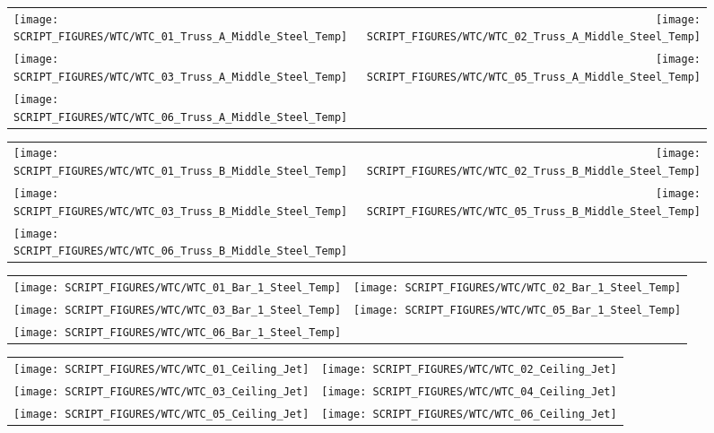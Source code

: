 \begin{figure}[!ht]
\begin{tabular*}{\textwidth}{l@{\extracolsep{\fill}}r}
\texttt{[image: SCRIPT\_FIGURES/WTC/WTC\_01\_Truss\_A\_Middle\_Steel\_Temp]} &
\texttt{[image: SCRIPT\_FIGURES/WTC/WTC\_02\_Truss\_A\_Middle\_Steel\_Temp]} \\
\texttt{[image: SCRIPT\_FIGURES/WTC/WTC\_03\_Truss\_A\_Middle\_Steel\_Temp]} &
\texttt{[image: SCRIPT\_FIGURES/WTC/WTC\_05\_Truss\_A\_Middle\_Steel\_Temp]} \\
\texttt{[image: SCRIPT\_FIGURES/WTC/WTC\_06\_Truss\_A\_Middle\_Steel\_Temp]}
\end{tabular*}
\end{figure}

\begin{figure}[!ht]
\begin{tabular*}{\textwidth}{l@{\extracolsep{\fill}}r}
\texttt{[image: SCRIPT\_FIGURES/WTC/WTC\_01\_Truss\_B\_Middle\_Steel\_Temp]} &
\texttt{[image: SCRIPT\_FIGURES/WTC/WTC\_02\_Truss\_B\_Middle\_Steel\_Temp]} \\
\texttt{[image: SCRIPT\_FIGURES/WTC/WTC\_03\_Truss\_B\_Middle\_Steel\_Temp]} &
\texttt{[image: SCRIPT\_FIGURES/WTC/WTC\_05\_Truss\_B\_Middle\_Steel\_Temp]} \\
\texttt{[image: SCRIPT\_FIGURES/WTC/WTC\_06\_Truss\_B\_Middle\_Steel\_Temp]}
\end{tabular*}
\end{figure}

\begin{figure}[!ht]
\begin{tabular*}{\textwidth}{l@{\extracolsep{\fill}}r}
\texttt{[image: SCRIPT\_FIGURES/WTC/WTC\_01\_Bar\_1\_Steel\_Temp]} &
\texttt{[image: SCRIPT\_FIGURES/WTC/WTC\_02\_Bar\_1\_Steel\_Temp]} \\
\texttt{[image: SCRIPT\_FIGURES/WTC/WTC\_03\_Bar\_1\_Steel\_Temp]} &
\texttt{[image: SCRIPT\_FIGURES/WTC/WTC\_05\_Bar\_1\_Steel\_Temp]} \\
\texttt{[image: SCRIPT\_FIGURES/WTC/WTC\_06\_Bar\_1\_Steel\_Temp]}
\end{tabular*}
\end{figure}

\begin{figure}[!ht]
\begin{tabular*}{\textwidth}{l@{\extracolsep{\fill}}r}
\texttt{[image: SCRIPT\_FIGURES/WTC/WTC\_01\_Ceiling\_Jet]} &
\texttt{[image: SCRIPT\_FIGURES/WTC/WTC\_02\_Ceiling\_Jet]} \\
\texttt{[image: SCRIPT\_FIGURES/WTC/WTC\_03\_Ceiling\_Jet]} &
\texttt{[image: SCRIPT\_FIGURES/WTC/WTC\_04\_Ceiling\_Jet]} \\
\texttt{[image: SCRIPT\_FIGURES/WTC/WTC\_05\_Ceiling\_Jet]} &
\texttt{[image: SCRIPT\_FIGURES/WTC/WTC\_06\_Ceiling\_Jet]}
\end{tabular*}
\end{figure}

